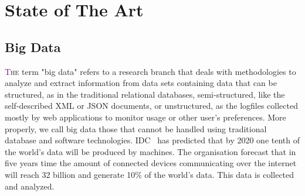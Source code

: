 \chapter{State of The Art} \label{chap:stateOfTheArt}

\section{Big Data}\label{sec:big_data}
\lettrine[lines=4]{\textcolor{purple}{T}}{he} term "big data" refers to a  research branch that deals with methodologies to analyze and extract information from data sets containing data that can be structured, as in the traditional relational databases, semi-structured, like the self-described XML or JSON documents, or unstructured, as the logfiles collected mostly by web applications to monitor usage or other user's preferences. More properly, we call big data those that cannot be handled using traditional database and software technologies. 
IDC~\cite{misc:IDC} has predicted that by 2020 one tenth of the world’s data will be produced by machines. The organisation forecast that in five years time the amount of connected devices communicating over the internet will reach 32 billion and generate 10\% of the world’s data.
This data is collected and analyzed. 
